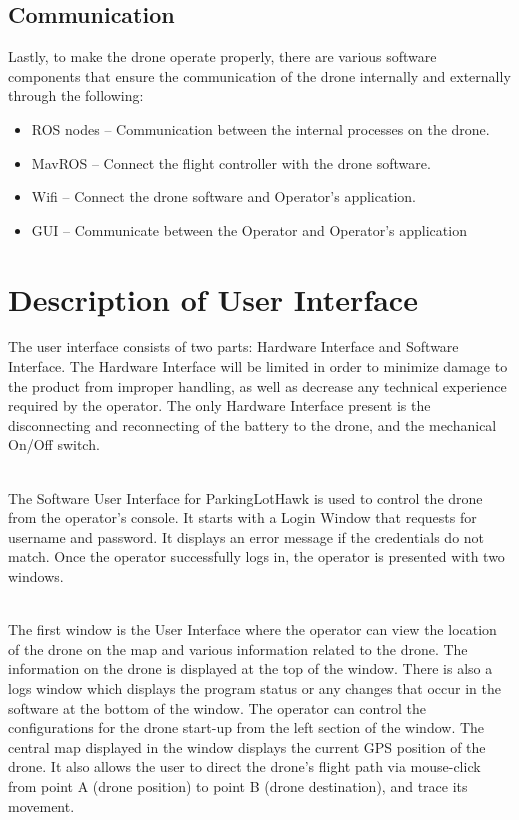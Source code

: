 \documentclass[12pt]{article}
\begin{document}
\subsection{Communication}

Lastly, to make the drone operate properly, there are various software components that ensure the communication of the drone internally and externally through the following:

\begin{itemize}
    \item ROS nodes – Communication between the internal processes on the drone.
    \item MavROS – Connect the flight controller with the drone software.
    \item Wifi – Connect the drone software and Operator’s application.
    \item GUI – Communicate between the Operator and Operator’s application
\end{itemize}

\section{Description of User Interface}


The user interface consists of two parts: Hardware Interface and Software Interface. The Hardware Interface will be limited in order to minimize damage to the product from improper handling, as well as decrease any technical experience required by the operator. The only Hardware Interface present is the disconnecting and reconnecting of the battery to the drone, and the mechanical On/Off switch. \\\

The Software User Interface for ParkingLotHawk is used to control the drone from the operator’s console. It starts with a Login Window that requests for username and password. It displays an error message if the credentials do not match. Once the operator successfully logs in, the operator is presented with two windows. \\\

The first window is the User Interface where the operator can view the location of the drone on the map and various information related to the drone. The information on the drone is displayed at the top of the window. There is also a logs window which displays the program status or any changes that occur in the software at the bottom of the window. The operator can control the configurations for the drone start-up from the left section of the window. The central map displayed in the window displays the current GPS position of the drone. It also allows the user to direct the drone's flight path via mouse-click from point A (drone position) to point B (drone destination), and trace its movement. \\\
\end{document}
